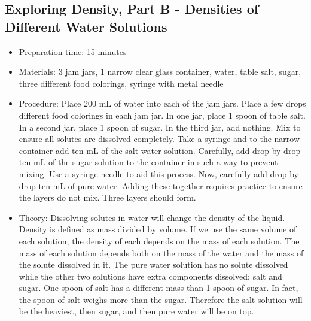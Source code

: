 \subsection{Exploring Density, Part B - Densities of Different Water Solutions}
\begin{itemize}
\item{Preparation time: 15 minutes}
\item{Materials: 3 jam jars, 1 narrow clear glass container, water, table salt, sugar, three different food colorings, syringe with metal needle}
\item{Procedure: Place 200 mL of water into each of the jam jars. Place a few drops different food colorings in each jam jar. In one jar, place 1 spoon of table salt. In a second jar, place 1 spoon of sugar. In the third jar, add nothing. Mix to ensure all solutes are dissolved completely. Take a syringe and to the narrow container add ten mL of the salt-water solution. Carefully, add drop-by-drop ten mL of the sugar solution to the container in such a way to prevent mixing. Use a syringe needle to aid this process. Now, carefully add drop-by-drop ten mL of pure water. Adding these together requires practice to ensure the layers do not mix. Three layers should form. }
\item{Theory: Dissolving solutes in water will change the density of the liquid. Density is defined as mass divided by volume. If we use the same volume of each solution, the density of each depends on the mass of each solution. The mass of each solution depends both on the mass of the water and the mass of the solute dissolved in it. The pure water solution has no solute dissolved while the other two solutions have extra components dissolved: salt and sugar. One spoon of salt has a different mass than 1 spoon of sugar. In fact, the spoon of salt weighs more than the sugar. Therefore the salt solution will be the heaviest, then sugar, and then pure water will be on top.}
\end{itemize}

